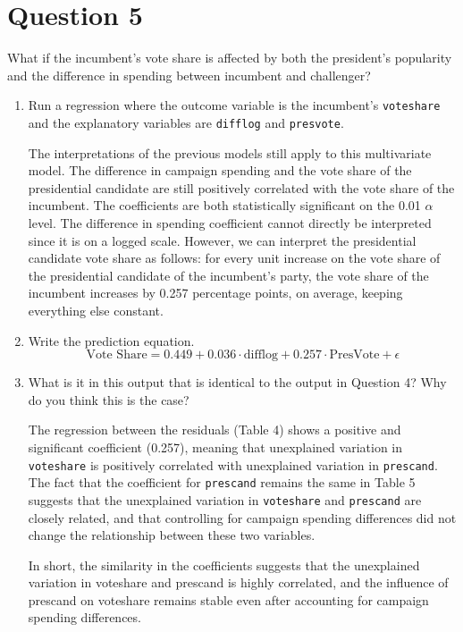 \documentclass[12pt,letterpaper]{article}
\begin{document}
\section*{Question 5}
\noindent What if the incumbent's vote share is affected by both the president's popularity and the difference in spending between incumbent and challenger? 
	\begin{enumerate}
		\item Run a regression where the outcome variable is the incumbent's \texttt{voteshare} and the explanatory variables are \texttt{difflog} and \texttt{presvote}.
		
		
		
		
		The interpretations of the previous models still apply to this multivariate model. The difference in campaign spending and the vote share of the presidential candidate are still positively correlated with the vote share of the incumbent. The coefficients are both statistically significant on the 0.01 $\alpha$ level. The difference in spending coefficient cannot directly be interpreted since it is on a logged scale. However, we can interpret the presidential candidate vote share as follows: for every unit increase on the vote share of the presidential candidate of the incumbent's party, the vote share of the incumbent increases by 0.257 percentage points, on average, keeping everything else constant. 
				

		\item Write the prediction equation.
		\begin{equation*}
			\text{Vote Share} = 0.449 + 0.036 \cdot \text{difflog} + 0.257 \cdot \text{PresVote} + \epsilon
		\end{equation*}
		
		\item What is it in this output that is identical to the output in Question 4? Why do you think this is the case?
		
		The regression between the residuals (Table 4) shows a positive and significant coefficient (0.257), meaning that unexplained variation in \texttt{voteshare} is positively correlated with unexplained variation in \texttt{prescand}.  The fact that the coefficient for \texttt{prescand} remains the same in Table 5 suggests that the unexplained variation in \texttt{voteshare} and \texttt{prescand} are closely related, and that controlling for campaign spending differences did not change the relationship between these two variables.
	
		In short, the similarity in the coefficients suggests that the unexplained variation in voteshare and prescand is highly correlated, and the influence of prescand on voteshare remains stable even after accounting for campaign spending differences.
		
		
	\end{enumerate}
\end{document}
